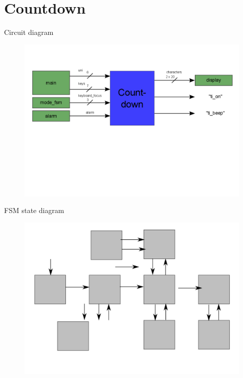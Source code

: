 \documentclass{beamer}
\begin{document}
\section{Countdown}

  \begin{frame}{Circuit diagram}
  	\begin{figure}
  		\includegraphics[scale=0.25]{./pictures/Countdown.png}
  	\end{figure}
  \end{frame}

  \begin{frame}{FSM  state diagram}
  	\begin{figure}
   		\includegraphics[scale=0.25]{./pictures/Cdsd.png}
    \end{figure}
  \end{frame}
%  
\end{document}
